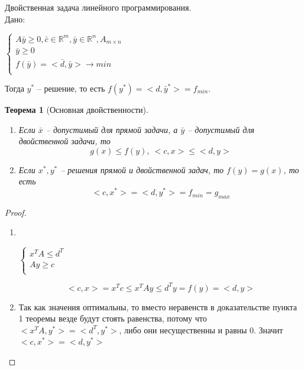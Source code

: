\documentclass[12pt]{article}
\newtheorem*{theorem}{Теорема}
\begin{document}
	Двойственная задача линейного программирования.\\
	Дано:
	\begin{center}
		$
		\left\{
		\begin{array}{lcl}
		A\bar y\geqslant 0, \bar c\in \mathbb{R}^m, \bar y \in \mathbb{R}^n, A_{m\times n}\\
		\bar y \geqslant 0\\
		f(\bar y)=<\bar d, \bar y> \to min\\
		\end{array}
		\right.
		$
	\end{center}
	Тогда $y^*$ -- решение, то есть $f(y^*)=<d, \bar y^*>=f_{min}$.
	\begin{theorem}[Основная двойственности]
		\ 
	\begin{enumerate}
		\item Если $\bar x$ -- допустимый для прямой задачи, а $\bar y$ -- допустимый для двойственной задачи, то $$g(x)\leqslant f(y), ~<c, x>\leqslant <d, y>$$
		\item Если $x^*, y^*$ -- решения прямой и двойственной задач, то $f(y)=g(x)$, то есть $$<c, x^*>=<d, y^*>=f_{min}=g_{max}$$
	\end{enumerate}
	\end{theorem}
	\begin{proof}\ 
		\begin{enumerate}
			\item \ 
			\begin{center}    
			$
			\left\{
			\begin{array}{lcl}
			x^TA \leqslant d^T\\
			Ay\geqslant c\\
			\end{array}
			\right.
			$
			\end{center}
			$$<c, x>=x^Tc\leqslant x^TAy \leqslant d^Ty=f(y)=<d, y>$$
			\item 
			Так как значения оптимальны, то вместо неравенств в доказательстве пункта 1 теоремы везде будут стоять равенства, потому что $<x^TA, y^*>=<d^T, y^*>$, либо они несущественны и равны 0. Значит $<c, x^*>=<d, y^*>$
		\end{enumerate}
	\end{proof}
\end{document}
